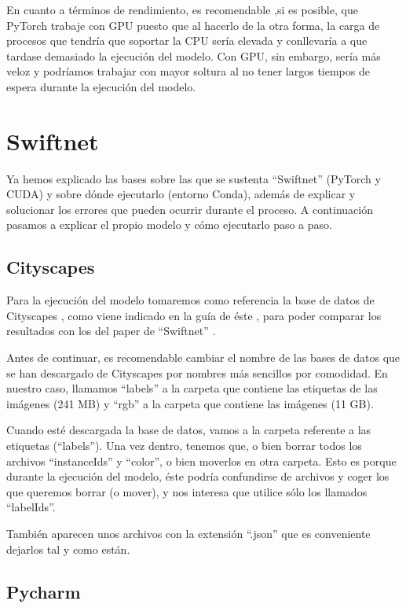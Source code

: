 En cuanto a términos de rendimiento, es recomendable ,si es posible, que PyTorch trabaje con \ac{GPU} puesto que al hacerlo de la otra forma, la carga de procesos que tendría que soportar la \ac{CPU} sería elevada y conllevaría a que tardase demasiado la ejecución del modelo. Con \ac{GPU}, sin embargo, sería más veloz y podríamos trabajar con mayor soltura al no tener largos tiempos de espera durante la ejecución del modelo.


\section{Swiftnet}

Ya hemos explicado las bases sobre las que se sustenta ``Swiftnet'' (PyTorch y CUDA) y sobre dónde ejecutarlo (entorno Conda), además de explicar y solucionar los errores que pueden ocurrir durante el proceso. A continuación pasamos a explicar el propio modelo y cómo ejecutarlo paso a paso.

\subsection{Cityscapes}

Para la ejecución del modelo tomaremos como referencia la base de datos de Cityscapes \cite{cityscapes}, como viene indicado en la guía de éste \cite{github_swiftnet}, para poder comparar los resultados con los del paper de ``Swiftnet'' \cite{swiftnet}.

Antes de continuar, es recomendable cambiar el nombre de las bases de datos que se han descargado de Cityscapes por nombres más sencillos por comodidad. En nuestro caso, llamamos ``labels'' a la carpeta que contiene las etiquetas de las imágenes (241 MB) y ``rgb'' a la carpeta que contiene las imágenes (11 GB).

Cuando esté descargada la base de datos, vamos a la carpeta referente a las etiquetas (``labels''). Una vez dentro, tenemos que, o bien borrar todos los archivos ``instanceIds'' y ``color'', o bien moverlos en otra carpeta. Esto es porque durante la ejecución del modelo, éste podría confundirse de archivos y coger los que queremos borrar (o mover), y nos interesa que utilice sólo los llamados ``labelIds''.

También aparecen unos archivos con la extensión ``.json'' que es conveniente dejarlos tal y como están.

\subsection{Pycharm}

